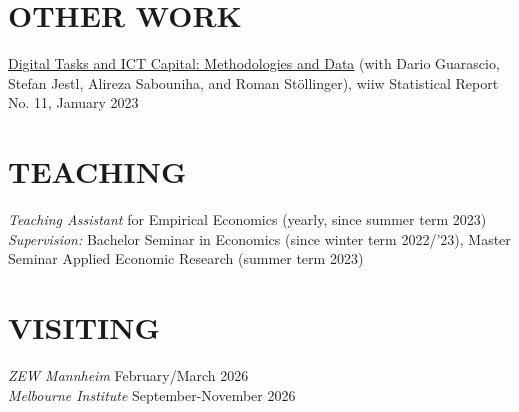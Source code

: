 \documentclass[margin, 12pt]{res} %
\begin{document}
\begin{resume}
		\section{OTHER WORK}
		
		\href{https://wiiw.ac.at/digital-tasks-and-ict-capital-methodologies-and-data-p-6429.html}{Digital Tasks and ICT Capital: Methodologies and Data} (with Dario Guarascio, Stefan Jestl, Alireza Sabouniha, and Roman Stöllinger), wiiw Statistical Report No. 11, January 2023
		
		
		
		\section{TEACHING}
		{\sl Teaching Assistant} for Empirical Economics (yearly, since summer term 2023)\\
		{\sl Supervision:} Bachelor Seminar in Economics (since winter term 2022/'23), Master Seminar Applied Economic Research (summer term 2023)
		
		\section{VISITING}
		{\sl ZEW Mannheim} \hfill February/March 2026 \\
		{\sl Melbourne Institute} \hfill September-November 2026
		

\end{resume}
\end{document}
